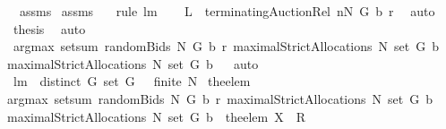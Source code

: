 \begin{isabellebody}
\ {}\ assms{\isacharparenleft}{}{\isacharparenright}\ \isanewline
assms{\isacharparenleft}{}{\isacharparenright}\ {}\ \isamarkupfalse%
\ {\isacharparenleft}rule\ lm{}{}{\isacharparenright}\ \isamarkupfalse%
\ \isamarkupfalse%
\ {\isachardoublequoteopen}{\isacharquery}L\ {\isacharequal}\ terminatingAuctionRel\ {\isacharparenleft}{\isacharquery}n{\isasymunion}N{\isacharparenright}\ G\ b\ r{\isachardoublequoteclose}\ \isamarkupfalse%
\ auto\isanewline
{}\isamarkupfalse%
\ \isamarkupfalse%
\ {\isacharquery}thesis\ \isamarkupfalse%
\ auto\isanewline
{}\isamarkupfalse%
%
\endisatagproof
{\isafoldproof}%
%
\isadelimproof
\isanewline
%
\endisadelimproof
\isanewline
{}\isamarkupfalse%
\ {\isachardoublequoteopen}argmax\ {\isacharparenleft}setsum\ {\isacharparenleft}randomBids{\isacharprime}\ N\ G\ b\ r{\isacharparenright}{\isacharparenright}\ {\isacharparenleft}maximalStrictAllocations{\isacharprime}\ N\ {\isacharparenleft}set\ G{\isacharparenright}\ b{\isacharparenright}\ {\isasymsubseteq}\ \isanewline
maximalStrictAllocations{\isacharprime}\ N\ {\isacharparenleft}set\ G{\isacharparenright}\ b{\isachardoublequoteclose}%
\isadelimproof
\ %
\endisadelimproof
%
\isatagproof
{}\isamarkupfalse%
\ auto%
\endisatagproof
{\isafoldproof}%
%
\isadelimproof
%
\endisadelimproof
\isanewline
\isanewline
{}\isamarkupfalse%
\ lm{}{}{\isacharcolon}\ \ {\isachardoublequoteopen}distinct\ G{\isachardoublequoteclose}\ {\isachardoublequoteopen}set\ G\ {\isasymnoteq}\ {\isacharbraceleft}{\isacharbraceright}{\isachardoublequoteclose}\ {\isachardoublequoteopen}finite\ N{\isachardoublequoteclose}\ \isanewline
{\isachardoublequoteopen}the{\isacharunderscore}elem\isanewline
{\isacharparenleft}argmax\ {\isacharparenleft}setsum\ {\isacharparenleft}randomBids{\isacharprime}\ N\ G\ b\ r{\isacharparenright}{\isacharparenright}\ {\isacharparenleft}maximalStrictAllocations{\isacharprime}\ N\ {\isacharparenleft}set\ G{\isacharparenright}\ b{\isacharparenright}{\isacharparenright}\ {\isasymin}\isanewline
{\isacharparenleft}maximalStrictAllocations{\isacharprime}\ N\ {\isacharparenleft}set\ G{\isacharparenright}\ b{\isacharparenright}{\isachardoublequoteclose}\ {\isacharparenleft}\ {\isachardoublequoteopen}the{\isacharunderscore}elem\ {\isacharquery}X\ {\isasymin}\ {\isacharquery}R{\isachardoublequoteclose}{\isacharparenright}%

\end{isabellebody}
